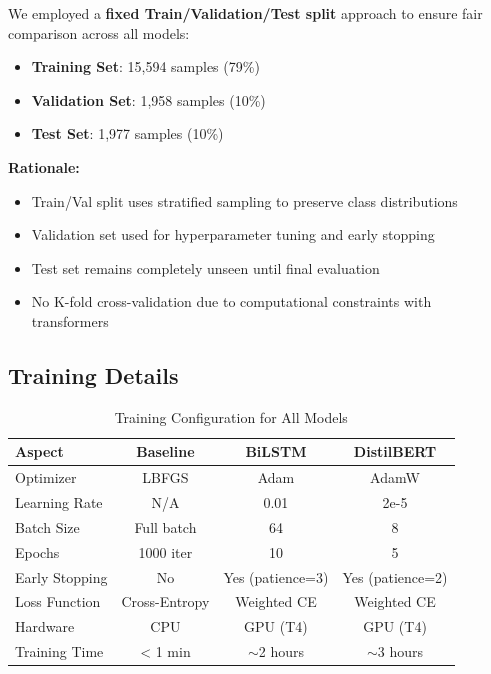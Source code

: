 \documentclass[12pt,a4paper]{article}
\begin{document}
We employed a \textbf{fixed Train/Validation/Test split} approach to ensure fair comparison across all models:

\begin{itemize}
    \item \textbf{Training Set}: 15,594 samples (79\%)
    \item \textbf{Validation Set}: 1,958 samples (10\%)
    \item \textbf{Test Set}: 1,977 samples (10\%)
\end{itemize}

\textbf{Rationale:}
\begin{itemize}
    \item Train/Val split uses stratified sampling to preserve class distributions
    \item Validation set used for hyperparameter tuning and early stopping
    \item Test set remains completely unseen until final evaluation
    \item No K-fold cross-validation due to computational constraints with transformers
\end{itemize}

\subsection{Training Details}

\begin{table}[H]
\centering
\begin{tabular}{@{}lccc@{}}
\toprule
\textbf{Aspect} & \textbf{Baseline} & \textbf{BiLSTM} & \textbf{DistilBERT} \\ \midrule
Optimizer & LBFGS & Adam & AdamW \\
Learning Rate & N/A & 0.01 & 2e-5 \\
Batch Size & Full batch & 64 & 8 \\
Epochs & 1000 iter & 10 & 5 \\
Early Stopping & No & Yes (patience=3) & Yes (patience=2) \\
Loss Function & Cross-Entropy & Weighted CE & Weighted CE \\
Hardware & CPU & GPU (T4) & GPU (T4) \\
Training Time & < 1 min & $\sim$2 hours & $\sim$3 hours \\ \bottomrule
\end{tabular}
\caption{Training Configuration for All Models}
\label{tab:training_config}
\end{table}
\end{document}
